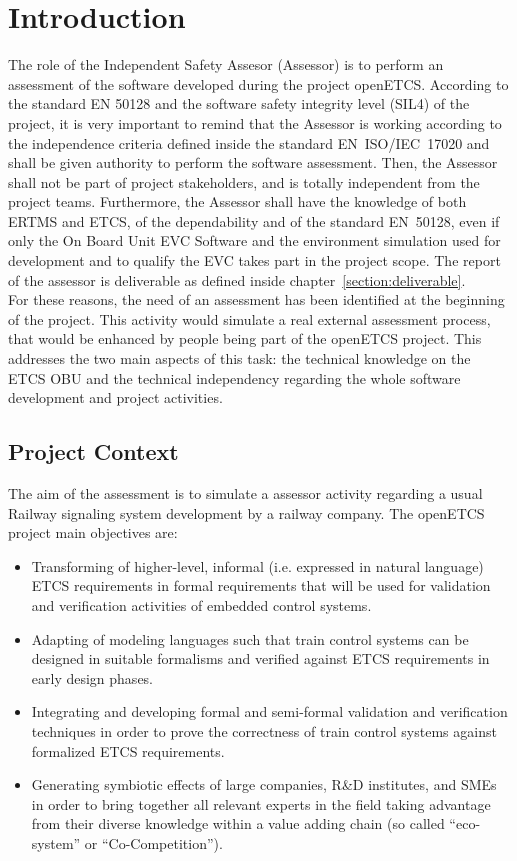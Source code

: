 \documentclass[openetcs]{template/openetcs_article}
\begin{document}
\section{Introduction}
The role of the Independent Safety Assesor (Assessor) is to perform an assessment of the software developed during the project openETCS. According to the standard EN 50128 and the software
safety integrity level (SIL4) of the project, it is very important to remind that the Assessor is working according to the independence criteria defined inside the standard EN~ISO/IEC~17020 \cite{EN17020} and shall be given
authority to perform the software assessment. Then, the Assessor shall not be part of project stakeholders, and is totally independent from the project teams.
Furthermore, the Assessor shall have the knowledge of both ERTMS and ETCS, of the dependability and of the standard EN~50128, even if only the On Board Unit EVC Software and the environment simulation used for development and to qualify the EVC takes part in the project scope. The report of the assessor is deliverable as defined inside chapter~\ref{section:deliverable}.
\\
For these reasons, the need of an assessment has been identified at the beginning of the project. This activity would simulate a real external
assessment process, that would be enhanced by people being part of the openETCS project. This addresses the two main aspects of this task:
the technical knowledge on the ETCS OBU and the technical independency regarding the whole software development and project activities.

\subsection{Project Context}
The aim of the assessment is to simulate a assessor activity regarding a usual Railway signaling system development by a railway company. The openETCS project main objectives are:
\begin{itemize}
\item Transforming of higher-level, informal (i.e. expressed in natural language) ETCS requirements in formal requirements that will be used for
validation and verification activities of embedded control systems.
\item Adapting of modeling languages such that train control systems can be designed in suitable formalisms and verified against ETCS requirements in early
design phases.
\item Integrating and developing formal and semi-formal validation and verification techniques in order to prove the correctness of train control systems
against formalized ETCS requirements.
\item Generating symbiotic effects of large companies, R\&D institutes, and SMEs in order to bring together all relevant experts in the field taking advantage
from their diverse knowledge within a value adding chain (so called “eco-system” or “Co-Competition”).
\end{itemize}
\end{document}
